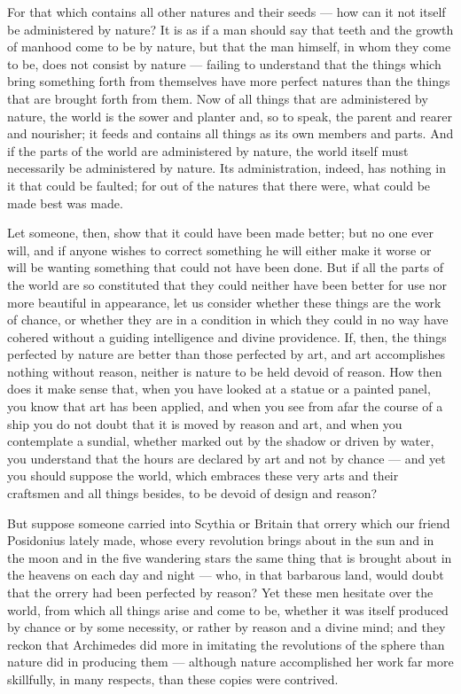  For that which contains all other natures and their seeds — how can it not itself be administered by nature? It is as if a man should say that teeth and the growth of manhood come to be by nature, but that the man himself, in whom they come to be, does not consist by nature — failing to understand that the things which bring something forth from themselves have more perfect natures than the things that are brought forth from them. Now of all things that are administered by nature, the world is the sower and planter and, so to speak, the parent and rearer and nourisher; it feeds and contains all things as its own members and parts. And if the parts of the world are administered by nature, the world itself must necessarily be administered by nature. Its administration, indeed, has nothing in it that could be faulted; for out of the natures that there were, what could be made best was made.

 Let someone, then, show that it could have been made better; but no one ever will, and if anyone wishes to correct something he will either make it worse or will be wanting something that could not have been done. But if all the parts of the world are so constituted that they could neither have been better for use nor more beautiful in appearance, let us consider whether these things are the work of chance, or whether they are in a condition in which they could in no way have cohered without a guiding intelligence and divine providence. If, then, the things perfected by nature are better than those perfected by art, and art accomplishes nothing without reason, neither is nature to be held devoid of reason. How then does it make sense that, when you have looked at a statue or a painted panel, you know that art has been applied, and when you see from afar the course of a ship you do not doubt that it is moved by reason and art, and when you contemplate a sundial, whether marked out by the shadow or driven by water, you understand that the hours are declared by art and not by chance — and yet you should suppose the world, which embraces these very arts and their craftsmen and all things besides, to be devoid of design and reason?

 But suppose someone carried into Scythia or Britain that orrery which our friend Posidonius lately made, whose every revolution brings about in the sun and in the moon and in the five wandering stars the same thing that is brought about in the heavens on each day and night — who, in that barbarous land, would doubt that the orrery had been perfected by reason? Yet these men hesitate over the world, from which all things arise and come to be, whether it was itself produced by chance or by some necessity, or rather by reason and a divine mind; and they reckon that Archimedes did more in imitating the revolutions of the sphere than nature did in producing them — although nature accomplished her work far more skillfully, in many respects, than these copies were contrived.


